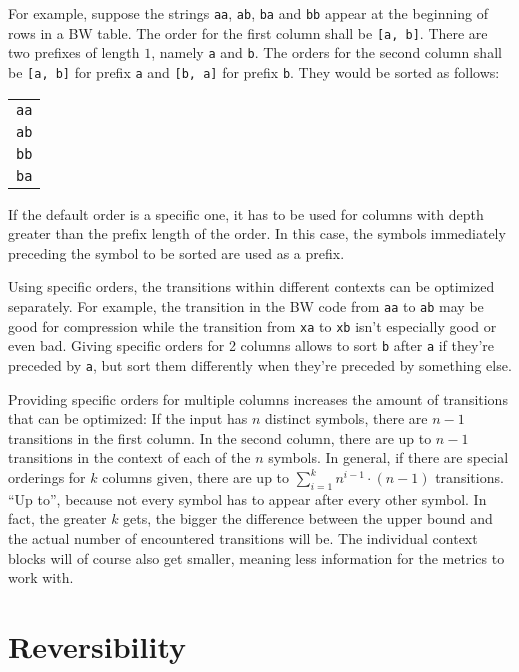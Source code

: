 \documentclass[a4paper]{scrreprt}
\begin{document}
For example, suppose the strings \texttt{aa}, \texttt{ab}, \texttt{ba} and
\texttt{bb} appear at the beginning of rows in a BW table. The order for the
first column shall be \texttt{[a, b]}. There are two prefixes of length \(1\),
namely \texttt{a} and \texttt{b}. The orders for the second column shall be
\texttt{[a, b]} for prefix \texttt{a} and \texttt{[b, a]} for prefix \texttt{b}.
They would be sorted as follows:

\begin{tabular}{c}
\texttt{aa} \\
\texttt{ab} \\
\texttt{bb} \\ 
\texttt{ba} \\
\end{tabular}

If the default order is a specific one, it has to be used for columns with depth
greater than the prefix length of the order. In this case, the symbols
immediately preceding the symbol to be sorted are used as a prefix.

Using specific orders, the transitions within different contexts can be
optimized separately. For example, the transition in the BW code from
\texttt{aa} to \texttt{ab} may be good for compression while the transition
from \texttt{xa} to \texttt{xb} isn't especially good or even bad. Giving
specific orders for 2 columns allows to sort \texttt{b} after \texttt{a} if
they're preceded by \texttt{a}, but sort them differently when they're preceded
by something else.

Providing specific orders for multiple columns increases the amount of
transitions that can be optimized: If the input has \(n\) distinct symbols,
there are \(n - 1\) transitions in the first column. In the second column, there
are up to \(n - 1\) transitions in the context of each of the \(n\) symbols. In
general, if there are special orderings for \(k\) columns given, there are up to
\(\sum_{i=1}^{k} n^{i - 1} \cdot (n - 1)\) transitions. ``Up to'', because not
every symbol has to appear after every other symbol. In fact, the greater \(k\)
gets, the bigger the difference between the upper bound and the actual number of
encountered transitions will be. The individual context blocks will of course
also get smaller, meaning less information for the metrics to work with.


\section{Reversibility}
\end{document}
